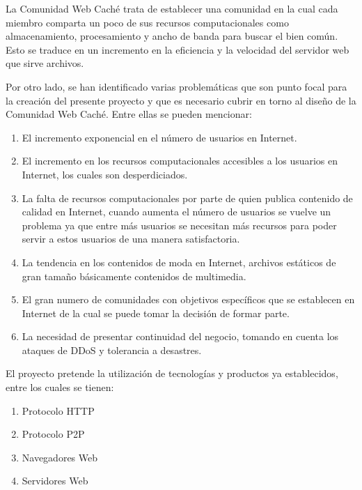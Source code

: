 La Comunidad Web Caché trata de establecer una comunidad en la cual cada miembro comparta un poco de sus recursos computacionales como almacenamiento, procesamiento y ancho de banda para buscar el bien común. Esto se traduce en un incremento en la eficiencia y la velocidad del servidor web que sirve archivos.

Por otro lado, se han identificado varias problemáticas que son punto focal para la creación del presente proyecto y que es necesario cubrir en torno al diseño de la Comunidad Web Caché. Entre ellas se pueden mencionar:

\begin{enumerate}
\item El incremento exponencial en el número de usuarios en Internet.
\item El incremento en los recursos computacionales accesibles a los usuarios en Internet, los cuales son desperdiciados. 
\item La falta de recursos computacionales por parte de quien publica contenido de calidad en Internet, cuando aumenta el número de usuarios se vuelve un problema ya que entre más usuarios se necesitan más recursos para poder servir a estos usuarios de una manera satisfactoria.
\item La tendencia en los contenidos de moda en Internet, archivos estáticos de gran tamaño básicamente contenidos de multimedia.
\item El gran numero de comunidades con objetivos específicos que se establecen en Internet de la cual se puede tomar la decisión de formar parte.
\item La necesidad de presentar continuidad del negocio, tomando en cuenta los ataques de DDoS y tolerancia a desastres. 
\end{enumerate}
  
 
El proyecto pretende la utilización de tecnologías y productos ya establecidos, entre los cuales se tienen:

\begin{enumerate}
\item Protocolo HTTP
\item Protocolo P2P
\item Navegadores Web
\item Servidores Web
\end{enumerate}

